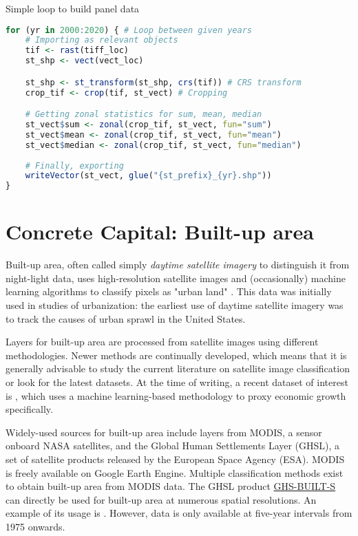 \documentclass[12pt]{article}
\begin{document}
\begin{codebox}[label=code:ntl_loop]{Simple loop to build panel data}
    \begin{lstlisting}[language=R, showspaces=false]
for (yr in 2000:2020) { # Loop between given years
    # Importing as relevant objects
    tif <- rast(tiff_loc)   
    st_shp <- vect(vect_loc) 

    st_shp <- st_transform(st_shp, crs(tif)) # CRS transform 
    crop_tif <- crop(tif, st_vect) # Cropping

    # Getting zonal statistics for sum, mean, median
    st_vect$sum <- zonal(crop_tif, st_vect, fun="sum")
    st_vect$mean <- zonal(crop_tif, st_vect, fun="mean")
    st_vect$median <- zonal(crop_tif, st_vect, fun="median")
    
    # Finally, exporting
    writeVector(st_vect, glue("{st_prefix}_{yr}.shp"))
}
    \end{lstlisting}
\end{codebox}

    
\section{Concrete Capital: Built-up area}

Built-up area, often called simply \textit{daytime satellite imagery} to distinguish it from night-light data, uses high-resolution satellite images and (occasionally) machine learning algorithms to classify pixels as "urban land" \parencite{baragwanath2021}. This data was initially used in studies of urbanization: the earliest use of daytime satellite imagery was \textcite{burchfield2006} to track the causes of urban sprawl in the United States.


Layers for built-up area are processed from satellite images using different methodologies. Newer methods are continually developed, which means that it is generally advisable to study the current literature on satellite image classification or look for the latest datasets. At the time of writing, a recent dataset of interest is \textcite{lehnert2023}, which uses a machine learning-based methodology to proxy economic growth specifically. 

Widely-used sources for built-up area include layers from MODIS, a sensor onboard NASA satellites, and the Global Human Settlements Layer (GHSL), a set of satellite products released by the European Space Agency (ESA). MODIS is freely available on Google Earth Engine. Multiple classification methods exist to obtain built-up area from MODIS data. The GHSL product \href{https://human-settlement.emergency.copernicus.eu/ghs_buS2023.php}{GHS-BUILT-S} can directly be used for built-up area at numerous spatial resolutions. An example of its usage is \textcite{ravi2024}. However, data is only available at five-year intervals from 1975 onwards.
\end{document}

